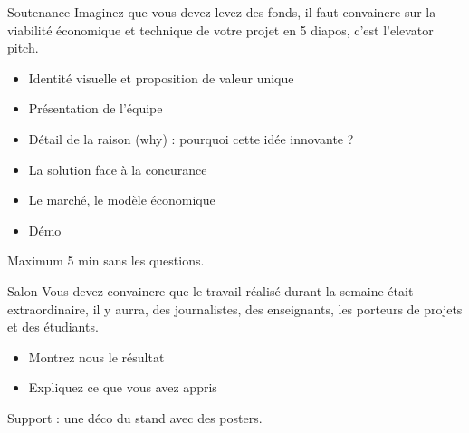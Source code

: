 \documentclass{beamer}
\begin{document}
\begin{frame}{Soutenance}
  Imaginez que vous devez levez des fonds, il faut convaincre sur la viabilité économique et technique de votre projet en 5 diapos, c'est l'elevator pitch.
  \begin{itemize}
    \item Identité visuelle et proposition de valeur unique
    \item Présentation de l'équipe
    \item Détail de la raison (why) : pourquoi cette idée innovante ?
    \item La solution face à la concurance 
    \item Le marché, le modèle économique
    \item Démo
  \end{itemize}

  Maximum 5 min sans les questions.
\end{frame}

\begin{frame}{Salon}
  Vous devez convaincre que le travail réalisé durant la semaine était extraordinaire, il y aurra, des journalistes, des enseignants, les porteurs de projets et des étudiants.
  \begin{itemize}
    \item Montrez nous le résultat
    \item Expliquez ce que vous avez appris
  \end{itemize}

  Support : une déco du stand avec des posters.

\end{frame}
\end{document}
